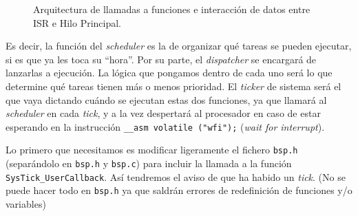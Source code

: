 \documentclass[../main.tex]{subfiles}
\begin{document}
\begin{figure}[htbp]
                \caption{Arquitectura de llamadas a funciones e interacción de datos entre ISR e Hilo Principal.}
                \label{fig:general_execution_diagram}
            \end{figure}

            Es decir, la función del \emph{scheduler} es la de organizar qué tareas se pueden ejecutar, si es que ya les toca su ``hora''. Por su parte, el \emph{dispatcher} se encargará de lanzarlas a ejecución. La lógica que pongamos dentro de cada uno será lo que determine qué tareas tienen más o menos prioridad. El \emph{ticker} de sistema será el que vaya dictando cuándo se ejecutan estas dos funciones, ya que llamará al \emph{scheduler} en cada \emph{tick}, y a la vez despertará al procesador en caso de estar esperando en la instrucción \lstinline|__asm volatile ("wfi");| (\emph{wait for interrupt}).

            Lo primero que necesitamos es modificar ligeramente el fichero \texttt{bsp.h} (separándolo en \texttt{bsp.h} y \texttt{bsp.c}) para incluir la llamada a la función \texttt{SysTick\_UserCallback}. Así tendremos el aviso de que ha habido un \emph{tick}. (No se puede hacer todo en \texttt{bsp.h} ya que saldrán errores de redefinición de funciones y/o variables)
\end{document}
